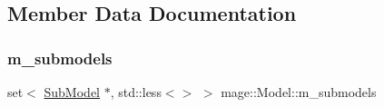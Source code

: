 \subsection{Member Data Documentation}
\hypertarget{classmage_1_1_model_a86c68c03650c206afa9c0a0b09a849e3}{}\label{classmage_1_1_model_a86c68c03650c206afa9c0a0b09a849e3} 
\subsubsection{\texorpdfstring{m\+\_\+submodels}{m\_submodels}}
{\footnotesize\ttfamily set$<$ \hyperlink{classmage_1_1_sub_model}{Sub\+Model} $\ast$, std\+::less$<$$>$ $>$ mage\+::\+Model\+::m\+\_\+submodels\hspace{0.3cm}{\ttfamily [private]}}

